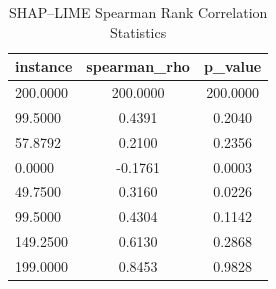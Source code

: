\begin{table}
\centering
\caption{SHAP–LIME Spearman Rank Correlation Statistics}
\label{tab:agreement}
\begin{tabular}{lcc}
\toprule
instance & spearman_rho & p_value \\
\midrule
200.0000 & 200.0000 & 200.0000 \\
99.5000 & 0.4391 & 0.2040 \\
57.8792 & 0.2100 & 0.2356 \\
0.0000 & -0.1761 & 0.0003 \\
49.7500 & 0.3160 & 0.0226 \\
99.5000 & 0.4304 & 0.1142 \\
149.2500 & 0.6130 & 0.2868 \\
199.0000 & 0.8453 & 0.9828 \\
\bottomrule
\end{tabular}
\end{table}

